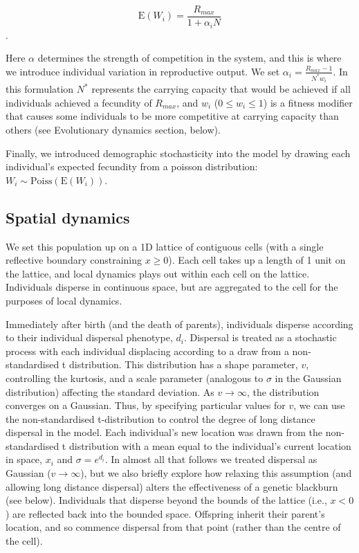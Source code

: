 \documentclass{article}
\begin{document}
\[ \text{E}(W_i)=\frac{R_{max}}{1+\alpha_i N}\].

Here \(\alpha\) determines the strength of competition in the system,
and this is where we introduce individual variation in reproductive
output. We set \(\alpha_i=\frac{R_{max}-1}{N^* w_i}\). In this
formulation \(N^*\) represents the carrying capacity that would be
achieved if all individuals achieved a fecundity of \(R_{max}\), and
\(w_i\) (\(0\leq w_i \leq 1\)) is a fitness modifier that causes some
individuals to be more competitive at carrying capacity than others (see
Evolutionary dynamics section, below).

Finally, we introduced demographic stochasticity into the model by
drawing each individual's expected fecundity from a poisson
distribution: \(W_i\sim\text{Poiss}(\text{E}(W_i))\).

\subsection{Spatial dynamics}

We set this population up on a 1D lattice of contiguous cells (with a
single reflective boundary constraining \(x\geq 0\)). Each cell takes up
a length of 1 unit on the lattice, and local dynamics plays out within
each cell on the lattice. Individuals disperse in continuous space, but
are aggregated to the cell for the purposes of local dynamics.

Immediately after birth (and the death of parents), individuals disperse
according to their individual dispersal phenotype, \(d_i\). Dispersal is
treated as a stochastic process with each individual displacing
according to a draw from a non-standardised t distribution.  This distribution has a shape parameter, $v$, controlling the kurtosis, and a scale parameter (analogous to $\sigma$ in the Gaussian distribution) affecting the standard deviation.  As $v \rightarrow \infty$, the distribution converges on a Gaussian.  Thus, by specifying particular values for $v$, we can use the non-standardised t-distribution to control the degree of long distance dispersal in the model.  Each individual's new location was drawn from the non-standardised t distribution with a mean equal to the
individual's current location in space, \(x_i\) and $\sigma=e^{d_i}$.   In almost all that follows we treated dispersal as Gaussian ($v \rightarrow \infty$), but we also briefly explore how relaxing this assumption (and allowing long distance dispersal) alters the effectiveness of a genetic blackburn (see below).  Individuals that disperse beyond the bounds of the
lattice (i.e., \(x<0\)) are reflected back into the bounded space.
Offspring inherit their parent's location, and so commence dispersal
from that point (rather than the centre of the cell).
\end{document}
